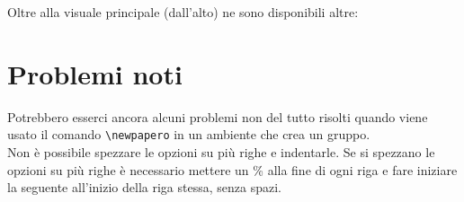 \documentclass[a4paper,10pt,parskip=half,numbers=noenddot]{scrartcl}
\newcommand\cs[1]{\texttt{\textbackslash#1}}
\begin{document}
	Oltre alla visuale principale (dall'alto) ne sono disponibili altre:
	\begin{example}
	\end{example}
	
\section{Problemi noti}
	Potrebbero esserci ancora alcuni problemi non del tutto risolti quando viene usato il comando \cs{newpapero} in un ambiente che crea un gruppo.\\
	Non è possibile spezzare le opzioni su più righe e indentarle. Se si spezzano le opzioni su più righe è necessario mettere un \% alla fine di ogni riga e fare iniziare la seguente all'inizio della riga stessa, senza spazi.
\end{document}
